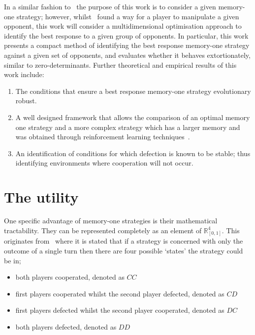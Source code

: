\documentclass[10pt]{article}
\newcommand{\R}{\mathbb{R}}
\begin{document}
In a similar fashion to~\cite{Press2012} the purpose of this work is to consider
a given memory-one strategy; however, whilst~\cite{Press2012} found a way for a
player to manipulate a given opponent, this work will consider a
multidimensional optimisation approach to identify the best response to a given
group of opponents. In particular, this work presents a compact method of
identifying the best response memory-one strategy against a given set of
opponents, and evaluates whether it behaves extortionately, similar to
zero-determinants. Further theoretical and empirical results of this work
include:

\begin{enumerate}
    \item The conditions that ensure a best response memory-one strategy evolutionary
    robust.
    \item A well designed framework that allows the comparison of an optimal
          memory one strategy and a more complex strategy which has a larger
          memory and was obtained through reinforcement learning
          techniques~\cite{Harper2017}.
    \item An identification of conditions for which defection is known to be
    stable; thus identifying environments where cooperation will not
    occur.
\end{enumerate}

\section{The utility}\label{section:utility}

One specific advantage of memory-one strategies is their mathematical
tractability. They can be represented completely as an element of \(\R^{4}_{[0, 1]}\). This
originates from~\cite{Nowak1989} where it is stated that if a strategy is
concerned with only the outcome of a single turn then there are four possible
`states' the strategy could be in;

\begin{itemize}
    \item both players cooperated, denoted as \(CC\)
    \item first players cooperated whilst the second player defected, denoted as \(CD\)
    \item first players defected whilst the second player cooperated, denoted as \(DC\)
    \item both players defected, denoted as \(DD\)
\end{itemize}
\end{document}
